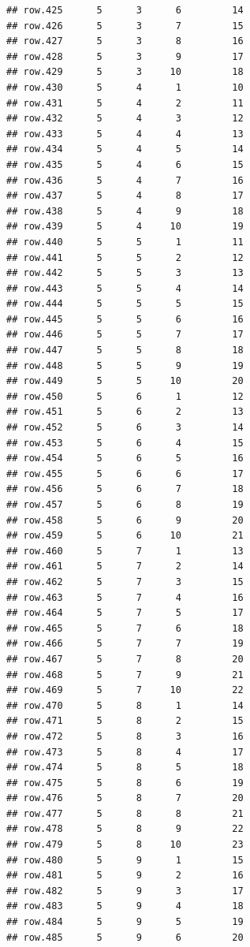 \documentclass[
]{article}
\begin{document}
\begin{verbatim}
## row.425      5      3      6         14
## row.426      5      3      7         15
## row.427      5      3      8         16
## row.428      5      3      9         17
## row.429      5      3     10         18
## row.430      5      4      1         10
## row.431      5      4      2         11
## row.432      5      4      3         12
## row.433      5      4      4         13
## row.434      5      4      5         14
## row.435      5      4      6         15
## row.436      5      4      7         16
## row.437      5      4      8         17
## row.438      5      4      9         18
## row.439      5      4     10         19
## row.440      5      5      1         11
## row.441      5      5      2         12
## row.442      5      5      3         13
## row.443      5      5      4         14
## row.444      5      5      5         15
## row.445      5      5      6         16
## row.446      5      5      7         17
## row.447      5      5      8         18
## row.448      5      5      9         19
## row.449      5      5     10         20
## row.450      5      6      1         12
## row.451      5      6      2         13
## row.452      5      6      3         14
## row.453      5      6      4         15
## row.454      5      6      5         16
## row.455      5      6      6         17
## row.456      5      6      7         18
## row.457      5      6      8         19
## row.458      5      6      9         20
## row.459      5      6     10         21
## row.460      5      7      1         13
## row.461      5      7      2         14
## row.462      5      7      3         15
## row.463      5      7      4         16
## row.464      5      7      5         17
## row.465      5      7      6         18
## row.466      5      7      7         19
## row.467      5      7      8         20
## row.468      5      7      9         21
## row.469      5      7     10         22
## row.470      5      8      1         14
## row.471      5      8      2         15
## row.472      5      8      3         16
## row.473      5      8      4         17
## row.474      5      8      5         18
## row.475      5      8      6         19
## row.476      5      8      7         20
## row.477      5      8      8         21
## row.478      5      8      9         22
## row.479      5      8     10         23
## row.480      5      9      1         15
## row.481      5      9      2         16
## row.482      5      9      3         17
## row.483      5      9      4         18
## row.484      5      9      5         19
## row.485      5      9      6         20

\end{verbatim}
\end{document}

